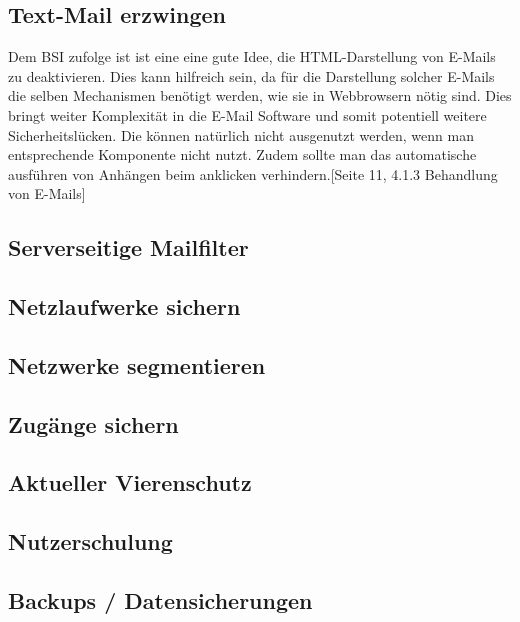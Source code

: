 \subsection{Text-Mail erzwingen}
	Dem BSI zufolge ist ist eine eine gute Idee, die HTML-Darstellung von E-Mails zu deaktivieren. Dies kann hilfreich sein, da für die Darstellung solcher E-Mails die selben Mechanismen benötigt werden, wie sie in Webbrowsern nötig sind. Dies bringt weiter Komplexität in die E-Mail Software und somit potentiell weitere Sicherheitslücken. Die können natürlich nicht ausgenutzt werden, wenn man entsprechende Komponente nicht nutzt. Zudem sollte man das automatische ausführen von Anhängen beim anklicken verhindern.\cite{bsi:ransome}[Seite 11, 4.1.3 Behandlung von E-Mails]
\subsection{Serverseitige Mailfilter}
	
\subsection{Netzlaufwerke sichern}
\subsection{Netzwerke segmentieren}
\subsection{Zugänge sichern}
\subsection{Aktueller Vierenschutz}
\subsection{Nutzerschulung}
\subsection{Backups / Datensicherungen}
